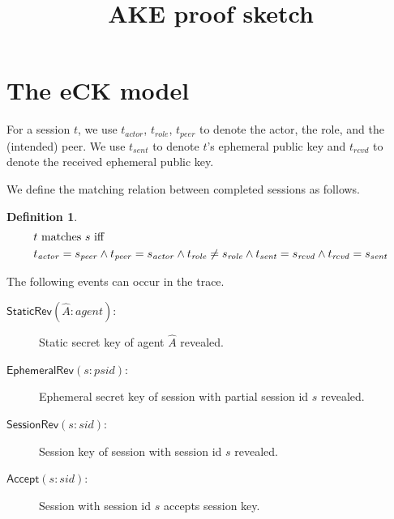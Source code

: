 \documentclass[]{article}
\newtheorem{definition}{Definition}
\begin{document}
\title{AKE proof sketch}
\author{}
\maketitle

\newcommand{\tr}{\mathit{tr}}

\newcommand{\StaticRev}{\mathsf{StaticRev}}
\newcommand{\EphemeralRev}{\mathsf{EphemeralRev}}
\newcommand{\SessionRev}{\mathsf{SessionRev}}
\newcommand{\Start}{\mathsf{Start}}
\newcommand{\Accept}{\mathsf{Accept}}
\newcommand{\Init}{\mathsf{Init_1}}
\newcommand{\Initt}{\mathsf{Init_2}}
\newcommand{\Resp}{\mathsf{Resp}}

\newcommand{\psid}{\mathit{psid}}
\newcommand{\sid}{\mathit{sid}}
\newcommand{\agent}{\mathit{agent}}

\newcommand{\actor}[1]{#1_{\mathit{actor}}}
\newcommand{\role}[1]{#1_{\mathit{role}}}
\newcommand{\peer}[1]{#1_{\mathit{peer}}}
\newcommand{\sent}[1]{#1_{\mathit{sent}}}
\newcommand{\rcvd}[1]{#1_{\mathit{rcvd}}}

\section{The eCK model}

For a session $t$, we use $\actor{t}$, $\role{t}$, $\peer{t}$ to denote the
  actor, the role, and the (intended) peer.
We use $\sent{t}$ to denote $t$'s ephemeral public key and $\rcvd{t}$ to denote
  the received ephemeral public key.

We define the matching relation between completed sessions as follows. \\
\begin{definition}
\begin{align*}
 &  t \textnormal{ matches } s \text{ iff } \\
 &  \actor{t} = \peer{s} \land
    \peer{t} = \actor{s} \land
    \role{t} \neq \role{s} \land
    \sent{t} = \rcvd{s} \land
    \rcvd{t} = \sent{s}
\end{align*}
\end{definition}

The following events can occur in the trace.
\begin{description}
\item[$\StaticRev(\hat{A} : \agent)$:] Static secret key of agent $\hat{A}$ revealed.
\item[$\EphemeralRev(s : \psid)$:] Ephemeral secret key of session with partial session
  id $s$ revealed.
\item[$\SessionRev(s : \sid)$:] Session key of session with session id $s$ revealed.
\item[$\Accept(s : \sid)$:] Session with session id $s$ accepts session key.
\end{description}
\end{document}

